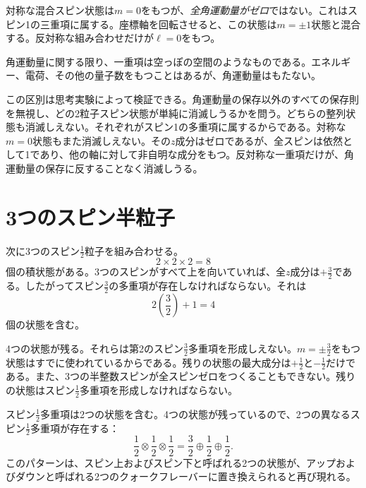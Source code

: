対称な混合スピン状態は\(m=0\)をもつが、\emph{全角運動量がゼロ}ではない。これはスピン1の三重項に属する。座標軸を回転させると、この状態は\(m=\pm1\)状態と混合する。反対称な組み合わせだけが\(\ell=0\)をもつ。

角運動量に関する限り、一重項は空っぽの空間のようなものである。エネルギー、電荷、その他の量子数をもつことはあるが、角運動量はもたない。

この区別は思考実験によって検証できる。角運動量の保存以外のすべての保存則を無視し、どの2粒子スピン状態が単純に消滅しうるかを問う。どちらの整列状態も消滅しえない。それぞれがスピン1の多重項に属するからである。対称な\(m=0\)状態もまた消滅しえない。その\(z\)成分はゼロであるが、全スピンは依然として1であり、他の軸に対して非自明な成分をもつ。反対称な一重項だけが、角運動量の保存に反することなく消滅しうる。

\begin{classroomqa}
\end{classroomqa}

\section{3つのスピン半粒子}

次に3つのスピン\(\tfrac12\)粒子を組み合わせる。
\begin{equation}
2\times2\times2=8
\end{equation}
個の積状態がある。3つのスピンがすべて上を向いていれば、全\(z\)成分は\(+\tfrac32\)である。したがってスピン\(\tfrac32\)の多重項が存在しなければならない。それは
\begin{equation}
2\left(\frac32\right)+1=4
\end{equation}
個の状態を含む。

4つの状態が残る。それらは第2のスピン\(\tfrac32\)多重項を形成しえない。\(m=\pm\tfrac32\)をもつ状態はすでに使われているからである。残りの状態の最大成分は\(+\tfrac12\)と\(-\tfrac12\)だけである。また、3つの半整数スピンが全スピンゼロをつくることもできない。残りの状態はスピン\(\tfrac12\)多重項を形成しなければならない。

スピン\(\tfrac12\)多重項は2つの状態を含む。4つの状態が残っているので、2つの異なるスピン\(\tfrac12\)多重項が存在する：
\begin{equation}
\frac12\otimes\frac12\otimes\frac12
=
\frac32\oplus\frac12\oplus\frac12.
\end{equation}
このパターンは、スピン上およびスピン下と呼ばれる2つの状態が、アップおよびダウンと呼ばれる2つのクォークフレーバーに置き換えられると再び現れる。

